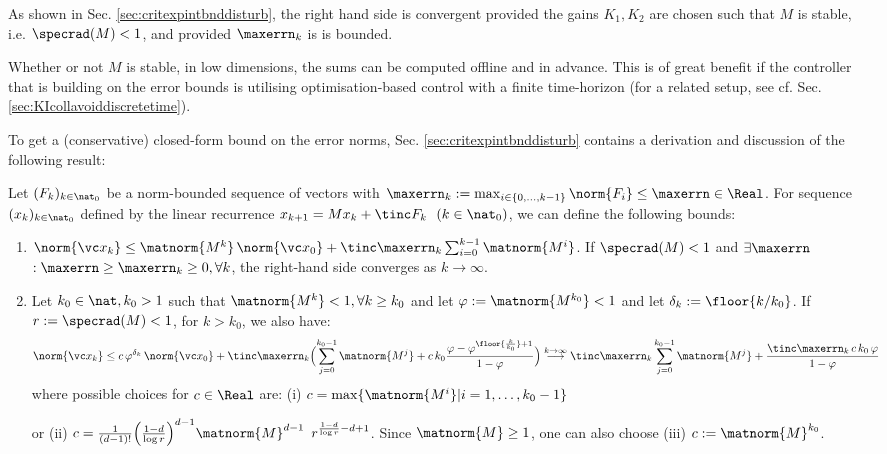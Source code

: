 As shown in Sec. \ref{sec:critexpintbnddisturb}, the right hand side is convergent provided the gains $K_1, K_2$ are chosen such that $M$ is stable, i.e. $\specrad(M) <1$, and provided $\maxerrn_k$ is is bounded. 

Whether or not $M$ is stable, in low dimensions, the sums can be computed offline and in advance. This is of great benefit if 
 the controller that is building on the error bounds is utilising optimisation-based control with a finite time-horizon (for a related setup, see cf. Sec. \ref{sec:KIcollavoiddiscretetime}).   

To get a (conservative) closed-form bound on the error norms, Sec. \ref{sec:critexpintbnddisturb}
contains a derivation and discussion of the following result:

\begin{thm}\label{thm:normboundsboundeddisturbmainbody}
Let $(F_k)_{k \in \nat_0}$ be a norm-bounded sequence of vectors with $\maxerrn_k :=\max_{i \in \{0,\ldots,k-1\}} \norm{F_i} \leq \maxerrn \in \Real$. 
For sequence $(x_k)_{k \in \nat_0}$ defined by the linear recurrence 
	$x_{k+1}  = M x_k + \tinc F_k \,\,\,\, (k \in \nat_0)$, we can define the following bounds:
	
	\begin{enumerate}
	\item $\norm{\vc x_k} \leq \matnorm{M^{k}} \, \norm{\vc x_0} + \tinc \maxerrn_{k} \sum_{i=0}^{k-1}  \matnorm{M^{i}}$. If $\specrad(M) <1$ and $\exists \maxerrn$ $:\maxerrn\geq \maxerrn_k \geq 0, \forall k$, the right-hand side converges as $k \to \infty$.
	\item Let $k_0 \in \nat, k_0 >1$ such that $\matnorm{M^k} <1, \forall k \geq k_0$ and let $\varphi := \matnorm{M^{k_0}} <1$ and let $\delta_k := \floor{k/k_0}$. If $r:=\specrad(M) < 1$, for $k > k_0$,  we also have:
	\begin{align} \norm{\vc x_k} &\leq c \, \varphi^{\delta_k} \, \norm{\vc x_0} + \tinc \maxerrn_{k} \Bigl(\sum_{j=0}^{k_0-1} \matnorm{M^j} + c \, k_0 \frac{\varphi-\varphi^{ \floor{\frac{k}{k_0}}+1 }}{1-\varphi} \Bigr) \stackrel{k \to \infty}{\longrightarrow} \tinc \maxerrn_{k} \sum_{j=0}^{k_0-1} \matnorm{M^j} 
	+ \frac{\tinc \maxerrn_{k}\,  c\, k_0 \,\varphi}{1-\varphi} 
	\end{align}
	where possible choices for $c \in \Real$ are: 
(i) $c= \max\{\matnorm{M^i} | i=1,\ldots,k_0-1 \}$ 

or (ii) $c = \frac{1}{(d-1)!} \Bigl(\frac{1 - d}{\log r}\Bigr)^{d-1}	\matnorm{M}^{d-1}\, \, \, r^{\frac{1 - d}{\log r}-d+1}  $.
%
Since $\matnorm{M} \geq 1$, one can also choose (iii) $c:= \matnorm{M}^{k_0}$. %


\end{enumerate}
\end{thm}
